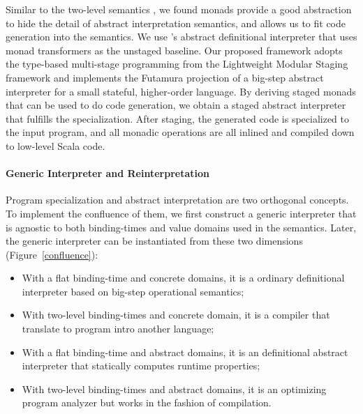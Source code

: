 Similar to the two-level semantics \cite{NIELSON1989117}, we found
monads provide a good abstraction to hide the detail of abstract
interpretation semantics, and allows us to fit code generation into
the semantics. We use \citet{DBLP:journals/pacmpl/DaraisLNH17}'s
abstract definitional interpreter that uses monad transformers as the
unstaged baseline.  Our proposed framework adopts the type-based
multi-stage programming from the Lightweight Modular Staging framework
and implements the Futamura projection of a big-step abstract
interpreter for a small stateful, higher-order language. By deriving
staged monads that can be used to do code generation, we obtain a
staged abstract interpreter that fulfills the specialization. After
staging, the generated code is specialized to the input program, and
all monadic operations are all inlined and compiled down to low-level
Scala code.



\paragraph{Generic Interpreter and Reinterpretation}

Program specialization and abstract interpretation are two orthogonal
concepts.  To implement the confluence of them, we first construct a
generic interpreter that is agnostic to both binding-times and value
domains used in the semantics.  Later, the generic interpreter can be
instantiated from these two dimensions (Figure~\ref{confluence}):
\begin{itemize}
\item With a flat binding-time and concrete domains, it is a ordinary
  definitional interpreter based on big-step operational semantics;
\item With two-level binding-times and concrete domain, it is a
  compiler that translate to program intro another language;
\item With a flat binding-time and abstract domains, it is an
  definitional abstract interpreter \cite{DBLP:journals/pacmpl/DaraisLNH17}
  that statically computes runtime properties;
\item With two-level binding-times and abstract domains, it is an optimizing
  program analyzer but works in the fashion of compilation.
\end{itemize}

